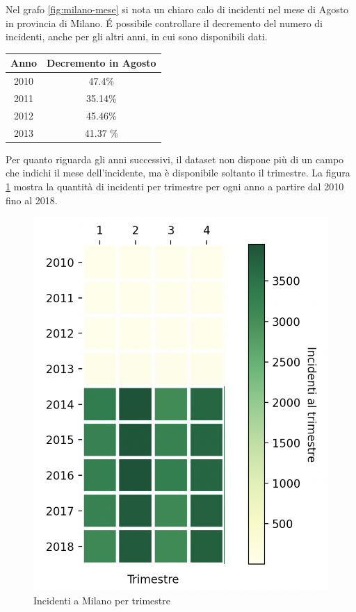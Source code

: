 \documentclass[a4paper]{report}
\begin{document}
Nel grafo \ref{fig:milano-mese} si nota un chiaro calo di incidenti 
nel mese di Agosto in provincia di Milano.
\'E possibile controllare il decremento del numero di incidenti, anche per gli altri anni, 
in cui sono disponibili dati.

\begin{center}
    \def\arraystretch{1.5}%
    \begin{tabular}{ |c|c| } 
    \hline
    Anno & Decremento in Agosto \\ 
    \hline
    2010 & 47.4\%  \\ 
    \rowcolor{TableGray}
    2011 & 35.14\% \\
    2012 & 45.46\% \\
    \rowcolor{TableGray}
    2013 & 41.37 \% \\
    \hline
    \end{tabular}
\end{center}

Per quanto riguarda gli anni successivi, il dataset non dispone più di un campo che indichi il mese 
dell'incidente, ma è disponibile soltanto il trimestre.
La figura \ref{fig:milano-trimestri} mostra la quantità di incidenti per trimestre per ogni 
anno a partire dal 2010 fino al 2018.

\begin{figure}
    \includegraphics[width=\linewidth]{../src/incidenti/incidenti_senza_coords/mese_incidenti/trimestri.png}
    \caption{Incidenti a Milano per trimestre}
    \label{fig:milano-trimestri}
\end{figure}
\end{document}
